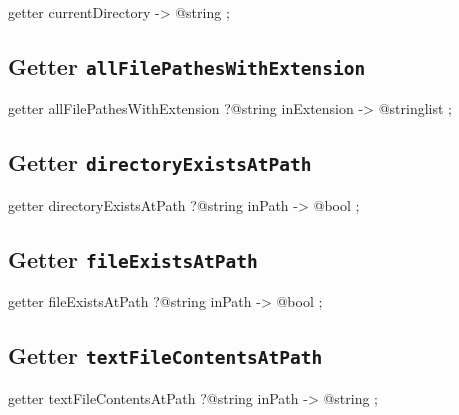 \begin{galgas}
getter currentDirectory -> @string ;
\end{galgas}








\subsection{Getter \texttt{allFilePathesWithExtension}}

\begin{galgas}
getter allFilePathesWithExtension ?@string inExtension -> @stringlist ;
\end{galgas}










\subsection{Getter \texttt{directoryExistsAtPath}}

\begin{galgas}
getter directoryExistsAtPath ?@string inPath -> @bool ;
\end{galgas}










\subsection{Getter \texttt{fileExistsAtPath}}

\begin{galgas}
getter fileExistsAtPath ?@string inPath -> @bool ;
\end{galgas}










\subsection{Getter \texttt{textFileContentsAtPath}}

\begin{galgas}
getter textFileContentsAtPath ?@string inPath -> @string ;
\end{galgas}










